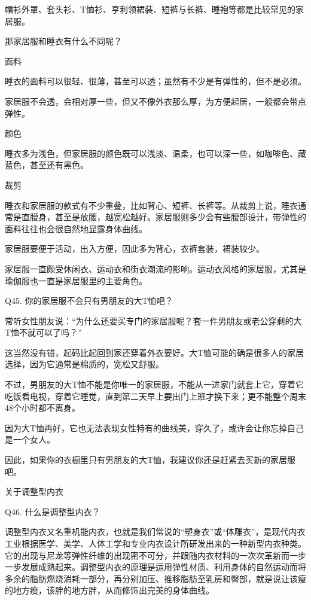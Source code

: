 \documentclass[12pt,UTF8]{ctexbook}
\begin{document}
帽衫外罩、套头衫、T恤衫、亨利领裙装、短裤与长裤、睡袍等都是比较常见的家居服。

那家居服和睡衣有什么不同呢？

面料

睡衣的面料可以很轻、很薄，甚至可以透；虽然有不少是有弹性的，但不是必须。

家居服不会透，会相对厚一些，但又不像外衣那么厚，为方便起居，一般都会带点弹性。

颜色

睡衣多为浅色，但家居服的颜色既可以浅淡、温柔，也可以深一些，如咖啡色、藏蓝色，甚至还有黑色。

裁剪

睡衣和家居服的款式有不少重叠，比如背心、短裤、长裤等。从裁剪上说，睡衣通常是直腰身，甚至是放腰，越宽松越好。家居服则多少会有些腰部设计，带弹性的面料往往也会很自然地显露身体曲线。

家居服要便于活动，出入方便，因此多为背心，衣裤套装，裙装较少。

家居服一直颇受休闲衣、运动衣和街衣潮流的影响。运动衣风格的家居服，尤其是瑜伽服也一直是家居服里的主要角色。





Q45. 你的家居服不会只有男朋友的大T恤吧？


常听女性朋友说：“为什么还要买专门的家居服呢？套一件男朋友或老公穿剩的大T恤不就可以了吗？”

这当然没有错，起码比起回到家还穿着外衣要好。大T恤可能的确是很多人的家居选择，因为它通常是棉质的，宽松又舒服。

不过，男朋友的大T恤不能是你唯一的家居服，不能从一进家门就套上它，穿着它吃饭看电视，穿着它睡觉，直到第二天早上要出门上班才换下来；更不能整个周末48个小时都不离身。

因为大T恤再好，它也无法表现女性特有的曲线美，穿久了，或许会让你忘掉自己是一个女人。

因此，如果你的衣橱里只有男朋友的大T恤，我建议你还是赶紧去买新的家居服吧。





关于调整型内衣


Q46. 什么是调整型内衣？


调整型内衣又名重机能内衣，也就是我们常说的“塑身衣”或“体雕衣”，是现代内衣工业根据医学、美学、人体工学和专业内衣设计所研发出来的一种新型内衣种类。它的出现与尼龙等弹性纤维的出现密不可分，并跟随内衣材料的一次次革新而一步一步发展成熟起来。调整型内衣的原理是运用弹性材质、利用身体的自然运动而将多余的脂肪燃烧消耗一部分，再分别加压、推移脂肪至乳房和臀部，就是说让该瘦的地方瘦，该胖的地方胖，从而修饰出完美的身体曲线。
\end{document}
